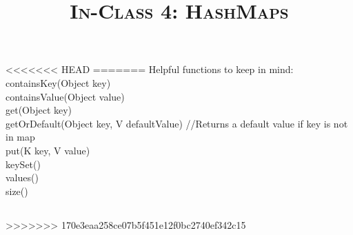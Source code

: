 \documentclass{article}
\title{\large{\textsc{In-Class 4: HashMaps}}}
\date{}
\begin{document}
    \maketitle

    \subsection*{}
<<<<<<< HEAD
=======
    \vspace{-15 mm}
    Helpful functions to keep in mind:\\
    \indent containsKey(Object key)\\
    \indent containsValue(Object value)\\
    \indent get(Object key)\\
    \indent getOrDefault(Object key, V defaultValue) //Returns a default value if key is not in map\\
    \indent put(K key, V value)\\
    \indent keySet()\\
    \indent values()\\
	\indent size()\\
    \subsection*{}
    \vspace{-10 mm}
>>>>>>> 170e3eaa258ce07b5f451e12f0bc2740ef342c15
\end{document}
